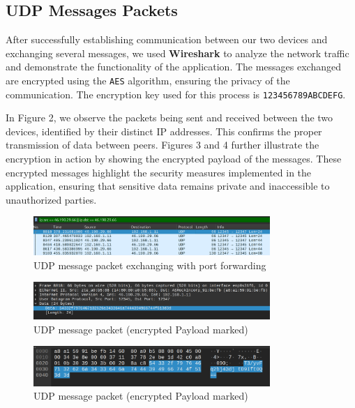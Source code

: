 \documentclass{article}
\begin{document}
\subsection{UDP Messages Packets}

After successfully establishing communication between our two devices and exchanging several messages, we used \textbf{Wireshark} to analyze the network traffic and demonstrate the functionality of the application. The messages exchanged are encrypted using the \texttt{AES} algorithm, ensuring the privacy of the communication. The encryption key used for this process is \texttt{123456789ABCDEFG}.

In Figure 2, we observe the packets being sent and received between the two devices, identified by their distinct IP addresses. This confirms the proper transmission of data between peers. Figures 3 and 4 further illustrate the encryption in action by showing the encrypted payload of the messages. These encrypted messages highlight the security measures implemented in the application, ensuring that sensitive data remains private and inaccessible to unauthorized parties.

\begin{figure}[h!]
    \centering
    \includegraphics[width=0.8\textwidth]{udp-messages-1.png}
    \caption{UDP message packet exchanging with port forwarding}
    \label{fig:udp-messages-1}
\end{figure}

\begin{figure}[h!]
    \centering
    \includegraphics[width=0.8\textwidth]{udp-messages-2.png}
    \caption{UDP message packet (encrypted Payload marked)}
    \label{fig:udp-messages-2}
\end{figure}

\begin{figure}[h!]
    \centering
    \includegraphics[width=0.8\textwidth]{udp-messages-3.png}
    \caption{UDP message packet (encrypted Payload marked)}
    \label{fig:udp-messages-3}
\end{figure}
\end{document}
